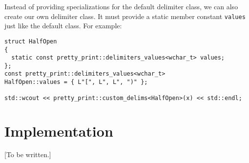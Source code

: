 \documentclass[a4paper,11pt]{article}
\begin{document}
Instead of providing specializations for the default delimiter class, we can also
create our own delimiter class. It must provide a static member constant \texttt{values}
just like the default class. For example:
\begin{verbatim}struct HalfOpen
{
  static const pretty_print::delimiters_values<wchar_t> values;
};
const pretty_print::delimiters_values<wchar_t>
HalfOpen::values = { L"[", L", L", ")" };

std::wcout << pretty_print::custom_delims<HalfOpen>(x) << std::endl;
\end{verbatim}

\section*{Implementation}

[To be written.]
\end{document}
